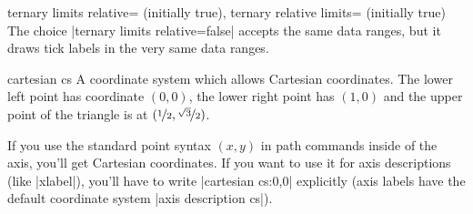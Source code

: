 \begin{pgfplotskeylist}{%
	ternary limits relative= (initially true),
	ternary relative limits= (initially true)}
	The choice |ternary limits relative=false| accepts the same data ranges, but it draws tick labels in the very same data ranges.
\begin{codeexample}[]
\end{codeexample}
\end{pgfplotskeylist}

\begin{coordinatesystem}{cartesian cs}
	A coordinate system which allows Cartesian coordinates. The lower left point has coordinate $(0,0)$, the lower right point has $(1,0)$ and the upper point of the triangle is at $(\nicefrac12, \nicefrac{\sqrt3}{2})$.

	If you use the standard point syntax $(x,y)$ in path commands inside of the axis, you'll get Cartesian coordinates. If you want to use it for axis descriptions (like |xlabel|), you'll have to write |cartesian cs:0,0| explicitly (axis labels have the default coordinate system |axis description cs|).
\begin{codeexample}[]
\end{codeexample}
\end{coordinatesystem}

